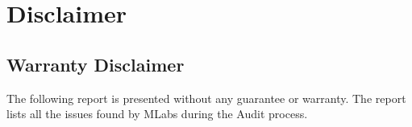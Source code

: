 \chapter {Disclaimer}

\section {Warranty Disclaimer}
The following report is presented without any guarantee or warranty. The report
lists all the issues found by MLabs during the Audit process.

